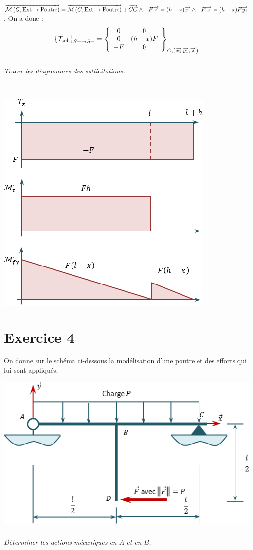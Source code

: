 \documentclass[10pt,fleqn]{article} %
\begin{document}
\begin{multicols}{2}
\begin{corrige}
$\vectm{G}{\text{Ext}}{\text{Poutre}}
=\vectm{C}{\text{Ext}}{\text{Poutre}} + \vect{GC}\wedge -F \vect{z}  
=  (h-x) \vect{x_1}  \wedge -F \vect{z}
=  (h-x) F \vect{y_1}
$. 
On a donc :
$$
\torseurscoh_{S+\rightarrow S-}
=\torseurcol{0}{0}{-F}{0}{(h-x) F}{0}{G,\left( \vect{x_1},\vect{y_1},\vect{z} \right)}
$$



\end{corrige}
\else 
\fi

\subparagraph{}
\textit{Tracer les diagrammes des sollicitations.}
\ifprof
\begin{corrige}~\\
\begin{center}
\includegraphics[width=.4\linewidth]{images/exo_02_corr_03}
\end{center}

\end{corrige}
\else 
\fi


\section*{Exercice 4}
\setcounter{subparagraph}{0}
On donne sur le schéma ci-dessous la modélisation d'une poutre et des efforts qui lui sont appliqués.
\begin{center}
\includegraphics[width=.45\textwidth]{images/exo_03}
\end{center}

\subparagraph{}
\textit{Déterminer les actions mécaniques en $A$ et en $B$.}
\ifprof
\begin{corrige}~\\


\end{corrige}
\end{multicols}
\end{document}
